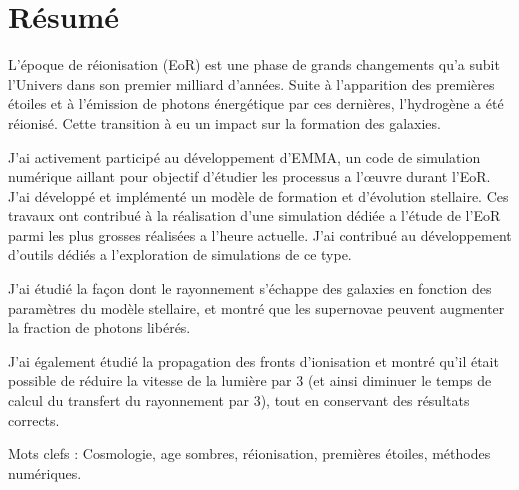 \begingroup
\let\clearpage\relax
\let\cleardoublepage\relax
\let\cleardoublepage\relax

\chapter*{Résumé}
L’époque de réionisation (EoR) est une phase de grands changements qu’a subit l’Univers dans son premier milliard d’années. Suite à l’apparition des premières étoiles et à l’émission de photons énergétique par ces dernières, l’hydrogène a été réionisé. Cette transition à eu un impact sur la formation des galaxies. 

J’ai activement participé au développement d’EMMA, un code de simulation numérique aillant pour objectif d’étudier les processus a l’œuvre durant l’EoR. J’ai développé et implémenté un modèle de formation et d’évolution stellaire. Ces travaux ont contribué à la réalisation d’une simulation dédiée a l’étude de l’EoR parmi les plus grosses réalisées a l’heure actuelle. J’ai contribué au développement d’outils dédiés a l’exploration de simulations de ce type.

J’ai étudié la façon dont le rayonnement s’échappe des galaxies en fonction des paramètres du modèle stellaire, et montré que les supernovae peuvent augmenter la fraction de photons libérés.

J’ai également étudié la propagation des fronts d’ionisation et montré qu’il était possible de réduire la vitesse de la lumière par 3 (et ainsi diminuer le temps de calcul du transfert du rayonnement par 3), tout en conservant des résultats corrects.

\vspace{0.5cm}

Mots clefs : Cosmologie, age sombres, réionisation, premières étoiles, méthodes numériques.
\vfill

\newpage

